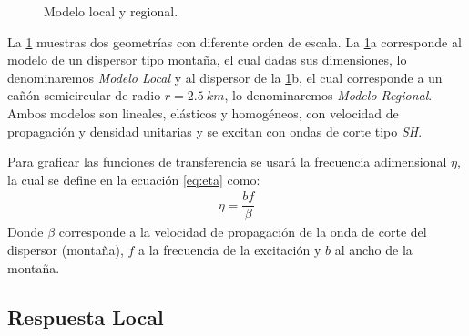 \documentclass[spanish,letterpaper,12pt,twoside,openany]{article}
\begin{document}
\begin{figure}[H]
	\centering
	\vspace{-.5 cm}
    \caption{Modelo local y regional.}
    \label{fig:modellocalregional}
    \vspace{-1 cm}
\end{figure}

La \cref{fig:modellocalregional} muestras dos geometrías con diferente orden de escala. La \cref{fig:modellocalregional}a corresponde al modelo de un dispersor tipo montaña, el cual dadas sus dimensiones, lo denominaremos \textit{Modelo Local} y al dispersor de la \cref{fig:modellocalregional}b, el cual corresponde a un cañón semicircular de radio $r=2.5\ km$, lo denominaremos \textit{Modelo Regional}. Ambos modelos son lineales, elásticos y homogéneos, con velocidad de propagación y densidad unitarias y se excitan con ondas de corte tipo \textit{SH}.

Para graficar las funciones de transferencia se usará la frecuencia adimensional $\eta$, la cual se define en la ecuación \cref{eq:eta} como:
%
	\begin{align}\label{eq:eta}
		\eta = \dfrac{b f}{\beta}
	\end{align}
%
Donde $\beta$ corresponde a la velocidad de propagación de la onda de corte del dispersor (montaña), $f$ a la frecuencia de la excitación y $b$ al ancho de la montaña.

\subsection{Respuesta Local}
\end{document}
